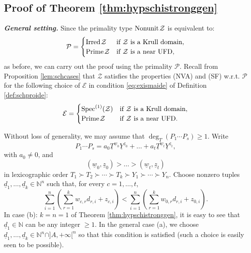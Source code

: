 \documentclass[11pt,a4paper,reqno]{amsart}
\def\N{\mathbb{N}}
\def\s1{{\rm Spec}^{(1)}}
\theoremstyle{definition}
\begin{document}
\subsection{Proof of Theorem \ref{thm:hypschistronggen}} \label{ssec:proof-thm5-1}
\noindent
\vskip 1mm
\noindent
\emph{\textbf{General setting.}}
Since the primality type ${\rm Nonunit}\hskip 1pt \mathcal{Z}$ is equivalent to:
$$
\mathcal{P}=
\begin{cases}
{\rm Irred}\hskip 1pt \mathcal{Z} & \textrm{if\,\,} \mathcal{Z}\,\,\textrm{is a Krull domain},\\
{\rm Prime}\hskip 1pt \mathcal{Z} & \textrm{if\,\,} \mathcal{Z}\,\,\textrm{is a near UFD},
\end{cases}
$$
as before, we can carry out the proof using the primality $\mathcal{P}$. Recall from Proposition \ref{lem:schcases} that ${\mathcal Z}$ satisfies the properties (NVA) and (SF) \hbox{w.r.t.} ${\mathcal P}$ for the following choice of ${\mathcal E}$ in condition \eqref{eq:exismaide} of Definition \ref{def:schproide}:
$$
\mathcal{E}=
\begin{cases}
\s1(\mathcal{Z}) & \textrm{if\,\,} \mathcal{Z}\,\,\textrm{is a Krull domain},\\
{\rm Prime}\hskip 1pt \mathcal{Z} & \textrm{if\,\,} \mathcal{Z}\,\,\textrm{is a near UFD}.
\end{cases}
$$ 

\noindent
Without loss of generality, we may assume that $\deg_{\underline T}(P_1 \cdots P_s) \geq 1$. Write
$$
P_1 \cdots P_s=a_0\underline{T}^{\underline w_0}\underline{Y}^{\underline z_0}+ \dots+a_t\underline{T}^{\underline w_t}\underline{Y}^{\underline z_t},
$$ with $a_0 \neq 0$, and
$$
(\underline w_0, \underline z_0)> \dots > (\underline{w}_t,\underline{z}_t)
$$ in lexicographic order $T_1 \succ T_2 \succ \cdots \succ T_k \succ Y_1 \succ \cdots \succ Y_n$. Choose nonzero tuples $\underline{d}_1,\dots,\underline{d}_k \in \mathbb{N}^n$
such that, for every $c=1,\dots,t$,
\begin{equation}\label{eq:condZg}
\sum_{i=1}^n\left(\sum_{r=1}^k w_{c,r} d_{r,i}+z_{c,i}\right)< \sum_{i=1}^n\left(\sum_{r=1}^k w_{0,r} d_{r,i}+z_{0,i}\right).
\end{equation}
In case (b): $k=n=1$ of Theorem \ref{thm:hypschistronggen}, it is easy to see that $\underline{d}_1 \in \N$ can be any integer $\geq 1$. In the general case (a), we choose $\underline{d}_1,\dots, \underline{d}_k \in \N^n \cap ]A,+\infty[^n$ so that this condition is satisfied {(such a choice is easily seen to be possible).}
\end{document}
